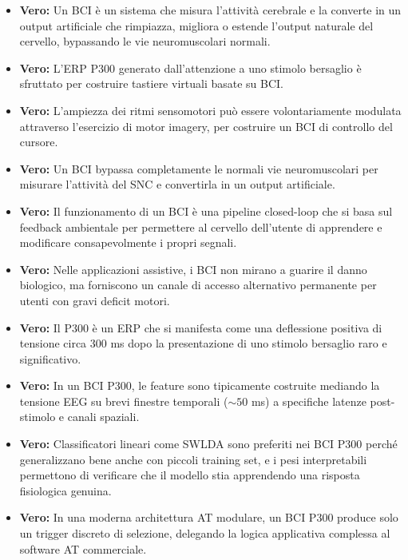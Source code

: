 \begin{itemize}
    \item \textbf{Vero:} Un BCI è un sistema che misura l'attività cerebrale e la converte in un output artificiale che rimpiazza, migliora o estende l'output naturale del cervello, bypassando le vie neuromuscolari normali.
    
    \item \textbf{Vero:} L'ERP P300 generato dall'attenzione a uno stimolo bersaglio è sfruttato per costruire tastiere virtuali basate su BCI.
    
    \item \textbf{Vero:} L'ampiezza dei ritmi sensomotori può essere volontariamente modulata attraverso l'esercizio di motor imagery, per costruire un BCI di controllo del cursore.
    
    \item \textbf{Vero:} Un BCI bypassa completamente le normali vie neuromuscolari per misurare l'attività del SNC e convertirla in un output artificiale.
    
    \item \textbf{Vero:} Il funzionamento di un BCI è una pipeline closed-loop che si basa sul feedback ambientale per permettere al cervello dell'utente di apprendere e modificare consapevolmente i propri segnali.
    
    \item \textbf{Vero:} Nelle applicazioni assistive, i BCI non mirano a guarire il danno biologico, ma forniscono un canale di accesso alternativo permanente per utenti con gravi deficit motori.
    
    \item \textbf{Vero:} Il P300 è un ERP che si manifesta come una deflessione positiva di tensione circa 300 ms dopo la presentazione di uno stimolo bersaglio raro e significativo.
    
    \item \textbf{Vero:} In un BCI P300, le feature sono tipicamente costruite mediando la tensione EEG su brevi finestre temporali ($\sim 50$ ms) a specifiche latenze post-stimolo e canali spaziali.
    
    \item \textbf{Vero:} Classificatori lineari come SWLDA sono preferiti nei BCI P300 perché generalizzano bene anche con piccoli training set, e i pesi interpretabili permettono di verificare che il modello stia apprendendo una risposta fisiologica genuina.
    
    \item \textbf{Vero:} In una moderna architettura AT modulare, un BCI P300 produce solo un trigger discreto di selezione, delegando la logica applicativa complessa al software AT commerciale.
    

\end{itemize}
